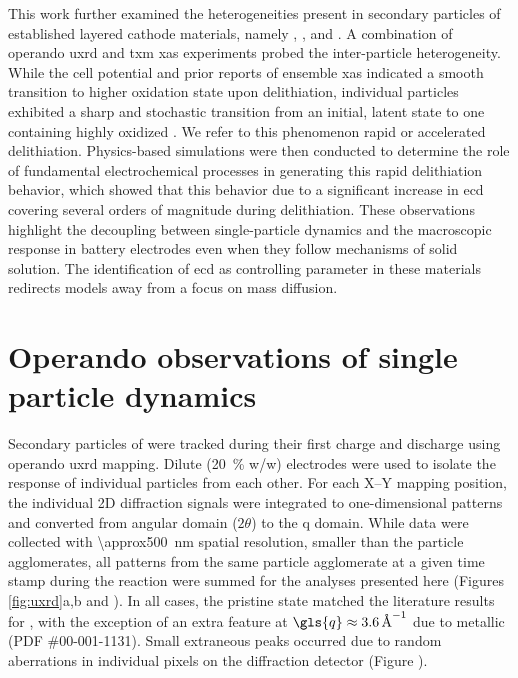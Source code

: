 \documentclass{article}
\begin{document}
This work further examined the heterogeneities present in secondary
particles of established layered cathode materials, namely \nca{},
\nmc[333]{}, and \nmc[532]{}. A combination of operando \gls{uxrd} and
\gls{txm} \gls{xas} experiments probed the inter-particle
heterogeneity. While the cell potential and prior reports of ensemble
\gls{xas} indicated a smooth transition to higher oxidation state upon
delithiation\cite{deb2005,muto2009}, individual particles exhibited a
sharp and stochastic transition from an initial, latent state to one
containing highly oxidized . We refer to this phenomenon rapid
or accelerated delithiation. Physics-based simulations were then
conducted to determine the role of fundamental electrochemical
processes in generating this rapid delithiation behavior, which showed
that this behavior due to a significant increase in \gls{ecd} covering
several orders of magnitude during delithiation. These observations
highlight the decoupling between single-particle dynamics and the
macroscopic response in battery electrodes even when they follow
mechanisms of solid solution. The identification of \gls{ecd} as
controlling parameter in these materials redirects models away from a
focus on mass diffusion.

\section{Operando observations of single particle dynamics}


Secondary particles of \nca{} were tracked during their first charge
and discharge using operando \gls{uxrd} mapping. Dilute
(\SI{20}{\percent} w/w) \nca{} electrodes were used to isolate the
response of individual particles from each other. For each X--Y
mapping position, the individual 2D diffraction signals were
integrated to one-dimensional patterns and converted from angular
domain ($2\theta$) to the \gls{q} domain. While data were collected
with \SI{\approx500}{\nano\meter} spatial resolution, smaller than the
particle agglomerates, all patterns from the same particle agglomerate
at a given time stamp during the reaction were summed for the analyses
presented here (Figures \ref{fig:uxrd}a,b and
). In all cases, the pristine state matched the
literature results for \nca{} \cite{novak2015}, with the exception of
an extra feature at $\gls{q}\approx\SI{3.6}{\per\angstrom}$ due to
metallic  (PDF \#00-001-1131). Small extraneous peaks occurred
due to random aberrations in individual pixels on the diffraction
detector (Figure ).
\end{document}
